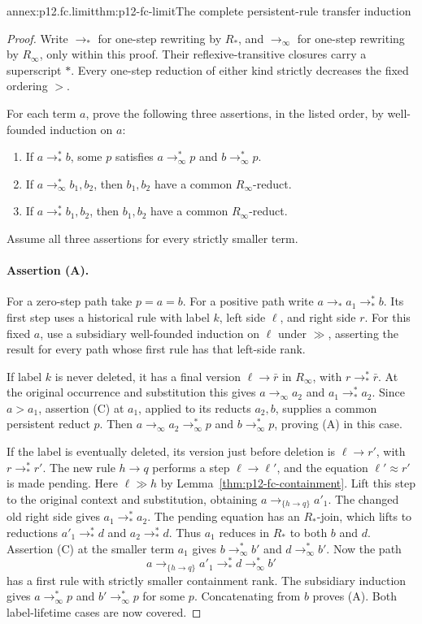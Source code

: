 \begin{annexitem}{annex:p12.fc.limit}{thm:p12-fc-limit}{The complete persistent-rule transfer induction}
\begin{proof}
Write \(\to_*\) for one-step rewriting by \(R_*\), and
\(\to_\infty\) for one-step rewriting by \(R_\infty\), only
within this proof. Their reflexive-transitive closures carry a
superscript \(*\). Every one-step reduction of either kind
strictly decreases the fixed ordering \(>\).

For each term \(a\), prove the following three assertions, in the
listed order, by well-founded induction on \(a\):
\begin{enumerate}
\item[(A)] If \(a\to_*^*b\), some \(p\) satisfies
      \(a\to_\infty^*p\) and \(b\to_\infty^*p\).
\item[(B)] If \(a\to_\infty^*b_1,b_2\), then
      \(b_1,b_2\) have a common \(R_\infty\)-reduct.
\item[(C)] If \(a\to_*^*b_1,b_2\), then
      \(b_1,b_2\) have a common \(R_\infty\)-reduct.
\end{enumerate}
Assume all three assertions for every strictly smaller term.

\paragraph{Assertion (A).}
For a zero-step path take \(p=a=b\). For a positive path write
\(a\to_*a_1\to_*^*b\). Its first step uses a historical rule
with label \(k\), left side \(\ell\), and right side \(r\).
For this fixed \(a\), use a subsidiary well-founded induction on
\(\ell\) under \(\gg\), asserting the result for every path
whose first rule has that left-side rank.

If label \(k\) is never deleted, it has a final version
\(\ell\to\bar r\) in \(R_\infty\), with
\(r\to_*^*\bar r\). At the original occurrence and substitution
this gives \(a\to_\infty a_2\) and
\(a_1\to_*^*a_2\). Since \(a>a_1\), assertion (C) at
\(a_1\), applied to its reducts \(a_2,b\), supplies a common
persistent reduct \(p\). Then
\(a\to_\infty a_2\to_\infty^*p\) and
\(b\to_\infty^*p\), proving (A) in this case.

If the label is eventually deleted, its version just before deletion
is \(\ell\to r'\), with \(r\to_*^*r'\). The new rule
\(h\to q\) performs a step \(\ell\to\ell'\), and the
equation \(\ell'\approx r'\) is made pending. Here
\(\ell\gg h\) by Lemma~\ref{thm:p12-fc-containment}.
Lift this step to the original context and substitution, obtaining
\(a\to_{\{h\to q\}}a'_1\). The changed old right side
gives \(a_1\to_*^*a_2\). The pending equation has an
\(R_*\)-join, which lifts to reductions
\(a'_1\to_*^*d\) and \(a_2\to_*^*d\).
Thus \(a_1\) reduces in \(R_*\) to both \(b\) and \(d\).
Assertion (C) at the smaller term \(a_1\) gives
\(b\to_\infty^*b'\) and \(d\to_\infty^*b'\).
Now the path
\[
 a\to_{\{h\to q\}}a'_1\to_*^*d\to_\infty^*b'
\]
has a first rule with strictly smaller containment rank. The
subsidiary induction gives \(a\to_\infty^*p\) and
\(b'\to_\infty^*p\) for some \(p\). Concatenating from
\(b\) proves (A). Both label-lifetime cases are now covered.


\end{proof}
\end{annexitem}
